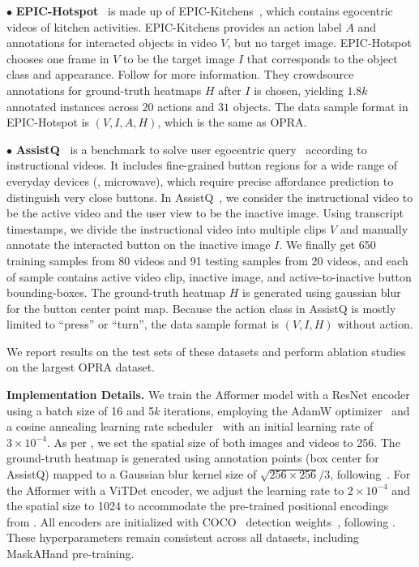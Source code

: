\documentclass[10pt,twocolumn,letterpaper]{article}
\begin{document}
\noindent
$\bullet$ \textbf{EPIC-Hotspot}~\cite{hotspot} is made up of EPIC-Kitchens~\cite{epic-kitchens-55}, which contains egocentric videos of kitchen activities. EPIC-Kitchens provides an action label $A$ and annotations for interacted objects in video $V$, but no target image. EPIC-Hotspot chooses one frame in $V$ to be the target image $I$ that corresponds to the object class and appearance. Follow \cite{hotspot} for more information. They crowdsource annotations for ground-truth heatmaps $H$ after $I$ is chosen, yielding $1.8k$ annotated instances across $20$ actions and $31$ objects. The data sample format in EPIC-Hotspot is $(V,I,A,H)$, which is the same as OPRA.

\noindent
$\bullet$ \textbf{AssistQ~\cite{assistq}} is a benchmark to solve user egocentric query~\cite{assistsr} according to instructional videos. It includes fine-grained button regions for a wide range of everyday devices (\eg, microwave), which require precise affordance prediction to distinguish very close buttons. In AssistQ~\cite{assistq}, we consider the instructional video to be the active video and the user view to be the inactive image. Using transcript timestamps, we divide the instructional video into multiple clips $V$ and manually annotate the interacted button on the inactive image $I$. We finally get 650 training samples from 80 videos and 91 testing samples from 20 videos, and each of sample contains active video clip, inactive image, and active-to-inactive button bounding-boxes. The ground-truth heatmap $H$ is generated using gaussian blur for the button center point map. Because the action class in AssistQ is mostly limited to ``press'' or ``turn'', the data sample format is $(V,I,H)$ without action.

We report results on the test sets of these datasets and perform ablation studies on the largest OPRA dataset.

\noindent\textbf{Implementation Details.} We train the Afformer model with a ResNet encoder using a batch size of 16 and 5$k$ iterations, employing the AdamW optimizer~\cite{adamw} and a cosine annealing learning rate scheduler~\cite{cosineanealinglr} with an initial learning rate of $3\times10^{-4}$. As per \cite{demo2vec}, we set the spatial size of both images and videos to 256. The ground-truth heatmap is generated using annotation points (box center for AssistQ) mapped to a Gaussian blur kernel size of $\sqrt{256\times256}/3$, following~\cite{demo2vec,hotspot}. For the Afformer with a ViTDet encoder, we adjust the learning rate to $2\times10^{-4}$ and the spatial size to 1024 to accommodate the pre-trained positional encodings from \cite{vitdet}. All encoders are initialized with COCO~\cite{coco} detection weights~\cite{faster_rcnn,vitdet}, following \cite{demo2vec}. These hyperparameters remain consistent across all datasets, including MaskAHand pre-training.
\end{document}

